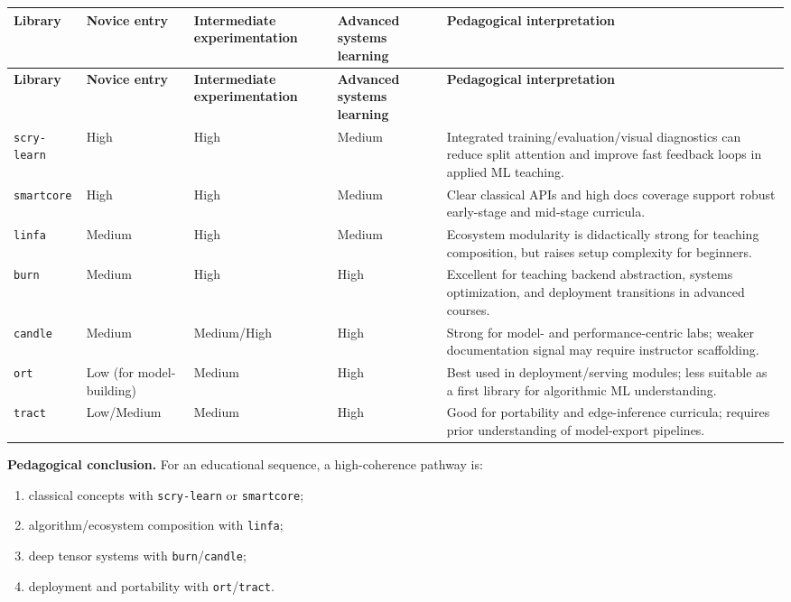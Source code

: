 \documentclass[11pt]{article}
\begin{document}
\begin{longtable}{p{1.8cm}p{2.6cm}p{2.6cm}p{2.6cm}p{5.0cm}}
\toprule
\textbf{Library} & \textbf{Novice entry} & \textbf{Intermediate experimentation} & \textbf{Advanced systems learning} & \textbf{Pedagogical interpretation} \\
\midrule
\endfirsthead
\toprule
\textbf{Library} & \textbf{Novice entry} & \textbf{Intermediate experimentation} & \textbf{Advanced systems learning} & \textbf{Pedagogical interpretation} \\
\midrule
\endhead
\texttt{scry-learn} & High & High & Medium & Integrated training/evaluation/visual diagnostics can reduce split attention and improve fast feedback loops in applied ML teaching. \\
\texttt{smartcore} & High & High & Medium & Clear classical APIs and high docs coverage support robust early-stage and mid-stage curricula. \\
\texttt{linfa} & Medium & High & Medium & Ecosystem modularity is didactically strong for teaching composition, but raises setup complexity for beginners. \\
\texttt{burn} & Medium & High & High & Excellent for teaching backend abstraction, systems optimization, and deployment transitions in advanced courses. \\
\texttt{candle} & Medium & Medium/High & High & Strong for model- and performance-centric labs; weaker documentation signal may require instructor scaffolding. \\
\texttt{ort} & Low (for model-building) & Medium & High & Best used in deployment/serving modules; less suitable as a first library for algorithmic ML understanding. \\
\texttt{tract} & Low/Medium & Medium & High & Good for portability and edge-inference curricula; requires prior understanding of model-export pipelines. \\
\bottomrule
\end{longtable}

\textbf{Pedagogical conclusion.} For an educational sequence, a high-coherence pathway is:
\begin{enumerate}[leftmargin=1.4em]
\item classical concepts with \texttt{scry-learn} or \texttt{smartcore};
\item algorithm/ecosystem composition with \texttt{linfa};
\item deep tensor systems with \texttt{burn}/\texttt{candle};
\item deployment and portability with \texttt{ort}/\texttt{tract}.
\end{enumerate}
\end{document}
